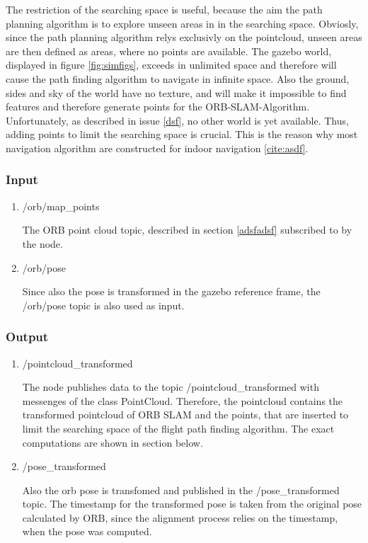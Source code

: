 	The restriction of the searching space is useful, because the aim the path planning algorithm is to explore unseen areas in in the searching space. Obviosly, 
	since the path planning algorithm relys exclusivly on the pointcloud, unseen areas are then defined as areas, where no points are available. The gazebo world, 
	displayed in figure \ref{fig:simfigs}, exceeds in unlimited space and therefore will cause the path finding algorithm to navigate in infinite space. Also the ground, sides and 
	sky of the world have no texture, and will make it impossible to find features and therefore generate points for the ORB-SLAM-Algorithm. Unfortunately, 
	as described in issue \ref{dsf}, no other world is yet available. Thus, adding points to 
	limit the searching space is crucial. This is the reason why most navigation algorithm are constructed for indoor navigation \ref{cite:asdf}. 
	
	\subsubsection{Input}
	
	\begin{enumerate}
	\item{/orb/map\_points}
	
	The ORB point cloud topic, described in section \ref{adsfadsf} subscribed to by the node. 
	
	\item{/orb/pose}
	
	Since also the pose is transformed in the gazebo reference frame, the /orb/pose topic is also used as input. 
	
	\end{enumerate}
	
	\subsubsection{Output}
	
	\begin{enumerate}
	\item{/pointcloud\_transformed}
	
	The node publishes data to the topic /pointcloud\_transformed with messenges of the class PointCloud. Therefore, the pointcloud contains the transformed 
	pointcloud of ORB SLAM and the points, that are inserted to limit the searching space of the flight path finding algorithm. 
	The exact computations are shown 
	in section below. 
	
	\item{/pose\_transformed}
	
	Also the orb pose is transfomed and published in the /pose\_transformed topic. The timestamp for the transformed pose is taken from the original pose 
	calculated by ORB, since the alignment process relies on the timestamp, when the pose was computed. 
	
	\end{enumerate}
	

